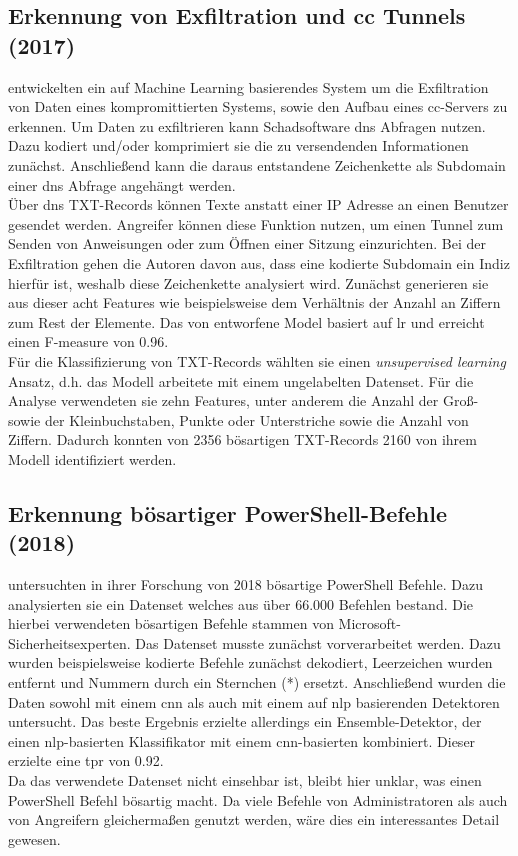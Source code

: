 \documentclass[
    12pt, %
    DIV10,
    ngerman, %
    a4paper, %
    oneside, %
    titlepage, %
    parskip=half, %
    headings=normal, %
    listof=totoc, %
    bibliography=totoc, %
    index=totoc, %
    captions=tableheading, %
    final %
]{scrreprt}
\begin{document}
\subsection{Erkennung von Exfiltration und \acs{cc} Tunnels (2017)}
\textcite{Das2018} entwickelten ein auf Machine Learning basierendes System um die Exfiltration von Daten eines kompromittierten Systems, sowie den Aufbau eines \ac{cc}-Servers zu erkennen. Um Daten zu exfiltrieren kann Schadsoftware \ac{dns} Abfragen nutzen. Dazu kodiert und/oder komprimiert sie die zu versendenden Informationen zunächst. Anschlie{\ss}end kann die daraus entstandene Zeichenkette als Subdomain einer \ac{dns} Abfrage angehängt werden.\\
Über \ac{dns} TXT-Records können Texte anstatt einer IP Adresse an einen Benutzer gesendet werden. Angreifer können diese Funktion nutzen, um einen Tunnel zum Senden von Anweisungen oder zum Öffnen einer Sitzung einzurichten.
Bei der Exfiltration gehen die Autoren davon aus, dass eine kodierte Subdomain ein Indiz hierfür ist, weshalb diese Zeichenkette analysiert wird. Zunächst generieren sie aus dieser acht Features wie beispielsweise dem Verhältnis der Anzahl an Ziffern zum Rest der Elemente. Das von \textcite{Das2018} entworfene Model basiert auf \acl{lr} und erreicht einen F-measure von 0.96.\\
Für die Klassifizierung von TXT-Records wählten sie einen \emph{unsupervised learning} Ansatz, d.h. das Modell arbeitete mit einem ungelabelten Datenset. Für die Analyse verwendeten sie zehn Features, unter anderem die Anzahl der Gro{\ss}- sowie der Kleinbuchstaben, Punkte oder Unterstriche sowie die Anzahl von Ziffern. Dadurch konnten von 2356 bösartigen TXT-Records 2160 von ihrem Modell identifiziert werden.
%
\subsection{Erkennung bösartiger PowerShell-Befehle (2018)}
\textcite{Hendler2018} untersuchten in ihrer Forschung von 2018 bösartige PowerShell Befehle. Dazu analysierten sie ein Datenset welches aus über 66.000 Befehlen bestand. Die hierbei verwendeten bösartigen Befehle stammen von Microsoft-Sicherheitsexperten.  Das Datenset musste zunächst vorverarbeitet werden. Dazu wurden beispielsweise kodierte Befehle zunächst dekodiert, Leerzeichen wurden entfernt und Nummern durch ein Sternchen (*) ersetzt. Anschlie{\ss}end wurden die Daten sowohl mit einem \ac{cnn} als auch mit einem auf \ac{nlp} basierenden Detektoren untersucht. Das beste Ergebnis erzielte allerdings ein Ensemble-Detektor, der einen \ac{nlp}-basierten Klassifikator mit einem \ac{cnn}-basierten kombiniert. Dieser erzielte eine \ac{tpr} von 0.92.\\
Da das verwendete Datenset nicht einsehbar ist, bleibt hier unklar, was einen PowerShell Befehl bösartig macht. Da viele Befehle von Administratoren als auch von Angreifern gleicherma{\ss}en genutzt werden, wäre dies ein interessantes Detail gewesen.
%
\end{document}
